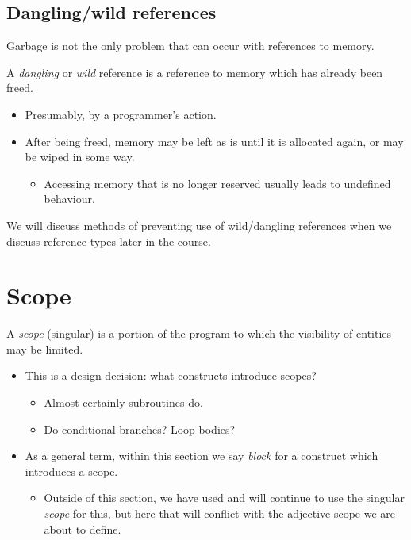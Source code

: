 \documentclass[11pt]{article}
\theoremstyle{definition}
\begin{document}
\subsection{Dangling/wild references}
\label{sec:orgb5e28f7}
Garbage is not the only problem that can occur with
references to memory.

A \emph{dangling} or \emph{wild} reference is a reference to memory
which has already been freed.
\begin{itemize}
\item Presumably, by a programmer's action.
\item After being freed, memory may be left as is until it
is allocated again, or may be wiped in some way.
\begin{itemize}
\item Accessing memory that is no longer reserved
usually leads to undefined behaviour.
\end{itemize}
\end{itemize}

We will discuss methods of preventing use of wild/dangling references
when we discuss reference types later in the course.

\section{Scope}
\label{sec:org05d4793}
A \emph{scope} (singular) is a portion of the program to which the visibility
of entities may be limited.
\begin{itemize}
\item This is a design decision: what constructs introduce scopes?
\begin{itemize}
\item Almost certainly subroutines do.
\item Do conditional branches? Loop bodies?
\end{itemize}
\item As a general term, within this section we say \emph{block} for a construct which
introduces a scope.
\begin{itemize}
\item Outside of this section, we have used and will continue to use the
singular \emph{scope} for this, but here that will conflict with
the adjective scope we are about to define.
\end{itemize}
\end{itemize}
\end{document}
